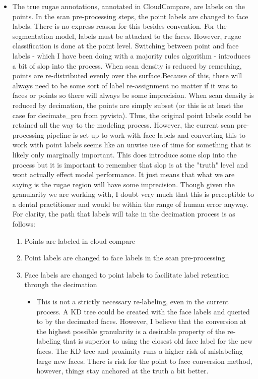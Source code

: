 \documentclass[11pt]{article}
\theoremstyle{definition}
\begin{document}
\begin{itemize}
    \item The true rugae annotations, annotated in CloudCompare, are labels on the points. In the scan pre-processing steps, the point labels are changed to face labels. There is no express reason for this besides convention. For the segmentation model, labels must be attached to the faces. However, rugae classification is done at the point level. Switching between point and face labels - which I have been doing with a majority rules algorithm - introduces a bit of slop into the process. When scan density is reduced by remeshing, points are re-distributed evenly over the surface.Because of this, there will always need to be some sort of label re-assignment no matter if it was to faces or points so there will always be some imprecision. When scan density is reduced by decimation, the points are simply subset (or this is at least the case for decimate\_pro from pyvista). Thus, the original point labels could be retained all the way to the modeling process. However, the current scan pre-processing pipeline is set up to work with face labels and converting this to work with point labels seems like an unwise use of time for something that is likely only marginally important. This does introduce some slop into the process but it is important to remember that slop is at the "truth" level and wont actually effect model performance. It just means that what we are saying is the rugae region will have some imprecision. Though given the granularity we are working with, I doubt very much that this is perceptible to a dental practitioner and would be within the range of human error anyway. For clarity, the path that labels will take in the decimation process is as follows:
    \begin{enumerate}
        \item Points are labeled in cloud compare
        \item Point labels are changed to face labels in the scan pre-processing
        \item Face labels are changed to point labels to facilitate label retention through the decimation
        \begin{itemize}
            \item This is not a strictly necessary re-labeling, even in the current process. A KD tree could be created with the face labels and queried to by the decimated faces. However, I believe that the conversion at the highest possible granularity is a desirable property of the re-labeling that is superior to using the closest old face label for the new faces. The KD tree and proximity runs a higher risk of mislabeling large new faces. There is risk for the point to face conversion method, however, things stay anchored at the truth a bit better. 

\end{itemize}
\end{enumerate}
\end{itemize}
\end{document}
